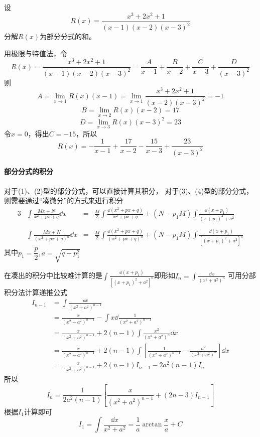 \begin{example}
    设
    \[ R(x) = \frac{x^3+2x^2+1}{(x-1)(x-2)(x-3)^2} \]
    分解$R(x)$为部分分式的和。
\end{example}
\begin{solution}
    用极限与特值法，令
    \[ R(x) = \frac{x^3+2x^2+1}{(x-1)(x-2)(x-3)^2} = \frac{A}{x-1} + \frac{B}{x-2} + \frac{C}{x-3} + \frac{D}{(x-3)^2} \]
    则
    \[ A = \lim_{x\to 1}R(x)(x-1) = \lim_{x\to 1}\frac{x^3+2x^2+1}{(x-2)(x-3)^2} = -1 \]
    \[ B = \lim_{x\to 2}R(x)(x-2) = 17 \]
    \[ D = \lim_{x\to 3}R(x)(x-3)^2 = 23 \]
    令$x=0$，得出$C=-15$，所以
    \[ R(x) = -\frac{1}{x-1} + \frac{17}{x-2} - \frac{15}{x-3} + \frac{23}{(x-3)^2} \]
\end{solution}



\paragraph{部分分式的积分}
对于(1)、(2)型的部分分式，可以直接计算其积分，
对于(3)、(4)型的部分分式，则需要通过“凑微分”的方式来进行积分
\begin{alignat*}{3}
     & \int \frac{Mx+N}{x^2+px+q}\dd{x}     & = & \frac{M}{2} \int \frac{\dd(x^2+px+q)}{x^2+px+q} + (N-p_1M)\int\frac{\dd(x+p_1)}{(x+p_1)^2+a^2}       \\
    \\
     & \int \frac{Mx+N}{(x^2+px+q)^n}\dd{x} & = & \frac{M}{2}\int\frac{\dd(x^2+px+q)}{(x^2+px+q)^n} + (N-p_1M)\int\frac{\dd(x+p_1)}{[(x+p_1)^2+a^2]^n}
\end{alignat*}
其中$p_1=\dfrac{p}{2},a=\sqrt{q-p_1^2}$

在凑出的积分中比较难计算的是$\displaystyle\int\frac{\dd(x+p_1)}{[(x+p_1)^2+a^2]^n} $即形如$\displaystyle I_n = \int\frac{\dd{x}}{(x^2+a^2)^n} $
可用分部积分法计算递推公式
\begin{align*}
    I_{n-1} & = \int\frac{\dd{x}}{(x^2+a^2)^{n-1}}                                                                              \\
            & = \frac{x}{(x^2+a^2)^{n-1}} - \int x \dd{\frac{1}{(x^2+a^2)^{n-1}}  }                                             \\
            & = \frac{x}{(x^2+a^2)^{n-1}} + 2(n-1)\int \frac{x^2}{(x^2+a^2)^n}\dd{x}                                            \\
            & = \frac{x}{(x^2+a^2)^{n-1}} + 2(n-1)\int \left[ \frac{1}{(x^2+a^2)^{n-1}} - \frac{a^2}{(x^2+a^2)^n} \right]\dd{x} \\
            & = \frac{x}{(x^2+a^2)^{n-1}} + 2(n-1)I_{n-1} - 2a^2(n-1)I_n
\end{align*}
所以
\[ I_n = \frac{1}{2a^2(n-1)}\left[ \frac{x}{(x^2+a^2)^{n-1}} + (2n-3)I_{n-1} \right] \]
根据$I_1$计算即可
\[ I_1 = \int\frac{\dd{x}}{x^2+a^2} = \frac{1}{a}\arctan \frac{x}{a} + C \]

